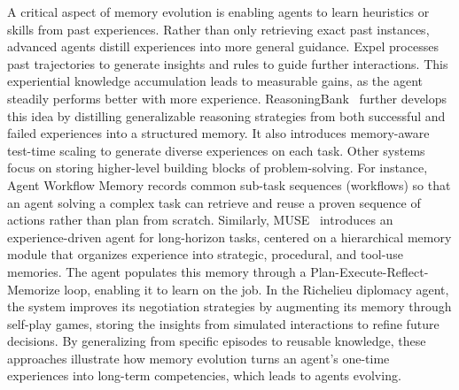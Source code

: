 A critical aspect of memory evolution is enabling agents to learn heuristics or skills from past experiences. Rather than only retrieving exact past instances, advanced agents distill experiences into more general guidance\citep{zhao2024expel, fu2024autoguide}. Expel\citep{zhao2024expel} processes past trajectories to generate insights and rules to guide further interactions. This experiential knowledge accumulation leads to measurable gains, as the agent steadily performs better with more experience. ReasoningBank~\citep{ouyang2025reasoningbank} further develops this idea by distilling generalizable reasoning strategies from both successful and failed experiences into a structured memory. It also introduces memory-aware test-time scaling to generate diverse experiences on each task.
Other systems focus on storing higher-level building blocks of problem-solving. For instance, Agent Workflow Memory\citep{wang2024agent} records common sub-task sequences (workflows) so that an agent solving a complex task can retrieve and reuse a proven sequence of actions rather than plan from scratch. Similarly, MUSE~\citep{yang2025learningonthejob} introduces an experience-driven agent for long-horizon tasks, centered on a hierarchical memory module that organizes experience into strategic, procedural, and tool-use memories. The agent populates this memory through a Plan-Execute-Reflect-Memorize loop, enabling it to learn on the job.
In the Richelieu diplomacy agent, the system improves its negotiation strategies by augmenting its memory through self-play games, storing the insights from simulated interactions to refine future decisions\citep{guan2024richelieu}.
By generalizing from specific episodes to reusable knowledge, these approaches illustrate how memory evolution turns an agent’s one-time experiences into long-term competencies, which leads to agents evolving.

